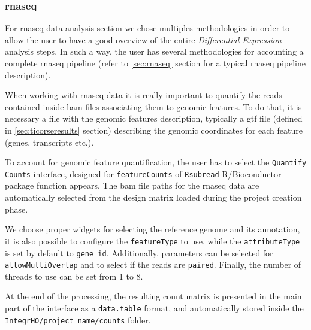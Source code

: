 
\subsubsection{\gls{rnaseq}} \label{sec:integrhorna}

For \gls{rnaseq} data analysis section we chose multiples methodologies in order to allow the user to have a good overview of the entire \textit{Differential Expression} analysis steps.
In such a way, the user has several methodologies for accounting a complete \gls{rnaseq} pipeline (refer to \ref{sec:rnaseq} section for a typical \gls{rnaseq} pipeline description).


When working with \gls{rnaseq} data it is really important to quantify the reads contained inside \gls{bam} files associating them to genomic features.
To do that, it is necessary a file with the genomic features description, typically a \gls{gtf} file (defined in \ref{sec:ticorseresults} section) describing the genomic coordinates for each feature (genes, transcripts etc.).

To account for genomic feature quantification, the user has to select the \lstinline!Quantify Counts! interface, designed for \lstinline!featureCounts! of \lstinline!Rsubread! R/Bioconductor package function \cite{Liao2014} appears.
The  \gls{bam} file paths for the \gls{rnaseq} data are automatically selected from the design matrix loaded during the project creation phase.

We choose proper widgets for selecting the reference genome and its annotation, it is also possible to configure the \lstinline!featureType! to use, while the \lstinline!attributeType! is set by default to \lstinline!gene_id!.
Additionally, parameters can be selected for \lstinline!allowMultiOverlap! and to select if the reads are \lstinline!paired!.
Finally, the number of threads to use can be set from 1 to 8.

At the end of the processing, the resulting count matrix is presented in the main part of the interface as a \lstinline!data.table! format, and automatically stored inside the \lstinline!IntegrHO/project_name/counts! folder.


